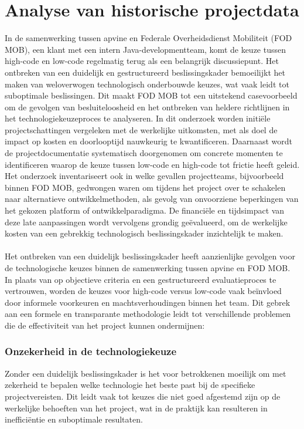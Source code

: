 \section{Analyse van historische projectdata}
In de samenwerking tussen apvine en Federale Overheidsdienst Mobiliteit (FOD MOB), een klant met een intern Java-developmentteam, komt de keuze tussen high-code en low-code regelmatig terug als een belangrijk discussiepunt. Het ontbreken van een duidelijk en gestructureerd beslissingskader bemoeilijkt het maken van weloverwogen technologisch onderbouwde keuzes, wat vaak leidt tot suboptimale beslissingen. Dit maakt \gls{FOD MOB} tot een uitstekend casevoorbeeld om de gevolgen van besluiteloosheid en het ontbreken van heldere richtlijnen in het technologiekeuzeproces te analyseren. In dit onderzoek worden initiële projectschattingen vergeleken met de werkelijke uitkomsten, met als doel de impact op kosten en doorlooptijd nauwkeurig te kwantificeren. Daarnaast wordt de projectdocumentatie systematisch doorgenomen om concrete momenten te identificeren waarop de keuze tussen low-code en high-code tot frictie heeft geleid. Het onderzoek inventariseert ook in welke gevallen projectteams, bijvoorbeeld binnen \gls{FOD MOB}, gedwongen waren om tijdens het project over te schakelen naar alternatieve ontwikkelmethoden, als gevolg van onvoorziene beperkingen van het gekozen platform of ontwikkelparadigma. De financiële en tijdsimpact van deze late aanpassingen wordt vervolgens grondig geëvalueerd, om de werkelijke kosten van een gebrekkig technologisch beslissingskader inzichtelijk te maken.
\\
\\
Het ontbreken van een duidelijk beslissingskader heeft aanzienlijke gevolgen voor de technologische keuzes binnen de samenwerking tussen apvine en \gls{FOD MOB}. In plaats van op objectieve criteria en een gestructureerd evaluatieproces te vertrouwen, worden de keuzes voor high-code versus low-code vaak beïnvloed door informele voorkeuren en machtsverhoudingen binnen het team. Dit gebrek aan een formele en transparante methodologie leidt tot verschillende problemen die de effectiviteit van het project kunnen ondermijnen:
\subsubsection{Onzekerheid in de technologiekeuze}
Zonder een duidelijk beslissingskader is het voor betrokkenen moeilijk om met zekerheid te bepalen welke technologie het beste past bij de specifieke projectvereisten. Dit leidt vaak tot keuzes die niet goed afgestemd zijn op de werkelijke behoeften van het project, wat in de praktijk kan resulteren in inefficiëntie en suboptimale resultaten.
